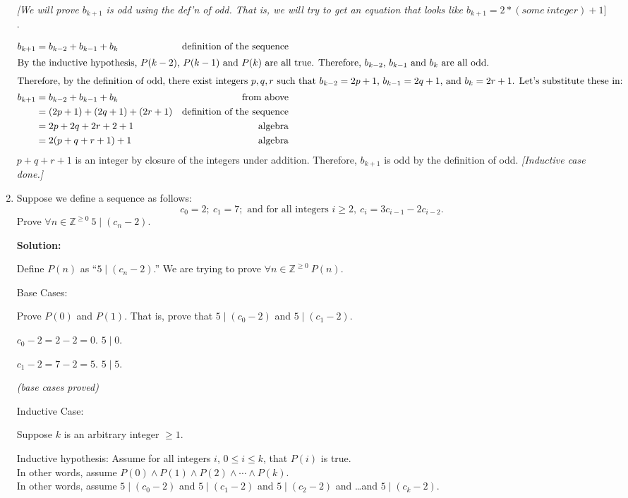\documentclass[11pt, letterpaper]{report}
\newcommand{\Z}{\mathbb{Z}}
\begin{document}
\begin{enumerate}
\textit{[We will prove $b_{k+1}$ is odd using the def'n of odd.  That is, we will try to get an equation that
looks like $b_{k+1}=2*(some\  integer)+1]$}.


\begin{align*}
b_{k+1} &= b_{k-2} + b_{k-1}  +b_{k} &\text{definition of the sequence}\\
\intertext{By the inductive hypothesis, $P(k-2)$, $P(k-1)$ and $P(k)$ are all true.  Therefore, $b_{k-2}$, $b_{k-1}$
and $b_k$ are all odd.}
\intertext{Therefore, by the definition of odd, there exist integers $p, q, r$ such that $b_{k-2}=2p+1$, $b_{k-1}=2q+1$,
and $b_{k}=2r+1$.  Let's substitute these in:}
b_{k+1} &= b_{k-2} + b_{k-1}  +b_{k} &\text{from above}\\
&= (2p+1) + (2q+1) + (2r+1) &\text{definition of the sequence}\\
&= 2p+2q+2r+2+1 & \text{algebra}\\
&= 2(p + q + r + 1) + 1 & \text{algebra}
\end{align*}
$p + q + r + 1$ is an integer by closure of the integers under addition.  Therefore, $b_{k+1}$ is odd by the definition of odd.
\textit{[Inductive case done.]}

\item Suppose we define a sequence as follows: 
$$
c_0 = 2; \ c_1=7; \text{ and for all integers }i \geq 2, \ c_i = 3c_{i-1} -2c_{i-2}. 
$$
Prove $\forall n \in \Z^{\geq 0} \ 5 \mid (c_n - 2)$.

\textbf{Solution:}

Define $P(n)$ as ``$5\mid (c_n-2)$.''  We are trying to prove $\forall n \in \Z^{\geq 0} \ P(n)$.

Base Cases:

Prove $P(0)$ and $P(1)$.  That is, prove that $5 \mid (c_0-2)$ and $5 \mid (c_1-2)$.

$c_0 -2= 2-2=0$.  $5\mid 0$.  \ \ \checkmark 

$c_1 -2= 7-2=5$.  $5\mid 5$.  \ \ \checkmark 

\textit{(base cases proved)}

Inductive Case:

Suppose $k$ is an arbitrary integer $\geq 1$.

Inductive hypothesis: Assume for all integers $i$, $0 \leq i \leq k$, that $P(i)$ is true.\\
In other words, assume $P(0) \land P(1) \land P(2) \land \cdots \land P(k)$.\\
In other words, assume $5 \mid (c_0-2)$ and $5 \mid (c_1-2)$ and $5 \mid (c_2-2)$ and \ldots and $5 \mid (c_k-2)$.




\end{enumerate}
\end{document}
